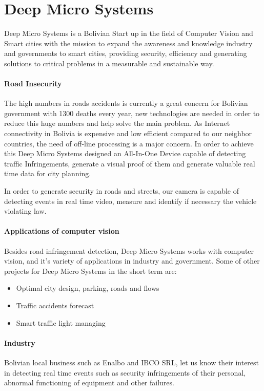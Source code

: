 \documentclass[fleqn,12pt]{SelfArx} %
\begin{document}
\section{Deep Micro Systems}

Deep Micro Systems is a Bolivian Start up in the field of Computer Vision and Smart cities with the mission to  expand the awareness and knowledge industry and governments to smart cities, providing security, efficiency and generating solutions to critical problems in a measurable and sustainable way.

\paragraph{Road Insecurity} The high numbers in roads accidents is currently a great concern for Bolivian government with 1300 deaths every year, new technologies are needed in order to reduce this huge numbers and help solve the main problem. As Internet connectivity in Bolivia is expensive and low efficient compared to our neighbor countries, the need of off-line processing is a major concern. In order to achieve this Deep Micro Systems designed an All-In-One Device capable of detecting traffic Infringements, generate a visual proof of them and generate valuable real time data for city planning.

In order to generate security in roads and streets, our camera is capable of detecting events in real time video, measure and identify if necessary the vehicle violating law.

\paragraph{Applications of computer vision} Besides road infringement detection, Deep Micro Systems works with computer vision, and it's variety of applications in industry and government. Some of other projects for Deep Micro Systems in the short term are:

\begin{itemize}[noitemsep] %
\item Optimal city design, parking, roads and flows
\item Traffic accidents forecast
\item Smart traffic light managing
\end{itemize}

\paragraph{Industry} Bolivian local business such as Enalbo and IBCO SRL, let us know their interest in detecting real time events such as security infringements of their personal, abnormal functioning of equipment and other failures.
\end{document}
